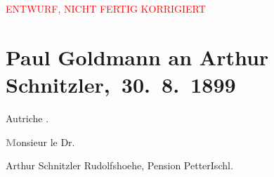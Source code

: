 
\begin{center}
            \textcolor{red}{ENTWURF, NICHT FERTIG KORRIGIERT}
                      \end{center}
            
         
         \renewcommand{\erwaehntePersonen}{Personen: Charlotte Bondy, Vít Šalomoun Bondy, Edgar Demange, Alfred Dreyfus, Alice Ziegler}
         \renewcommand{\erwaehnteInstitutionen}{Institutionen: Conseil de guerre de la Xe région militaire de Rennes}
         \renewcommand{\erwaehnteOrte}{Orte: Bad Ischl, Hotel und Pension Rudolfshöhe (Leopold Petter), Prag, Rennes, Österreich}
         \renewcommand{\erwaehnteWerke}{}
               \section[ Paul Goldmann an Arthur Schnitzler, 30. 8. 1899]{ Paul Goldmann an Arthur Schnitzler, 30. 8. 1899}\nopagebreak{}\rehead{ }\begin{ledgroupsized}[t]{13cm}\normalsize\beginnumbering \toendnotes[C]{\smallbreak\pagebreak[2]} 
\toendnotes[C]{\smallbreak}\pstart{}{\pb}\begin{otherlanguage}{french}Autriche . \end{otherlanguage}\pend{}\pstart{}\begin{otherlanguage}{french}\textcolor{gray}{\textbf{M}}onsieur le Dr. \end{otherlanguage}\pend{}\pstart{}Arthur Schnitzler \pend{}\pstart{}Rudolfshoehe, Pension Petter\pend{}\pstart{}Ischl. \pend{}{\bigskip}\pstart

\end{ledgroupsized}
